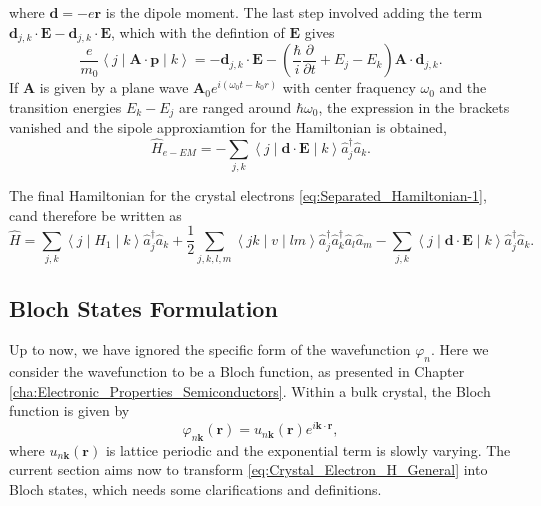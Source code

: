 where $\mathbf{d}=-e\mathbf{r}$ is the dipole moment. The last step
involved adding the term $\mathbf{d}_{j,k}\cdot\mathbf{E}-\mathbf{d}_{j,k}\cdot\mathbf{E}$,
which with the defintion of $\mathbf{E}$ gives\begin{equation}
\frac{e}{m_{0}}\left\langle j\mid\mathbf{A}\cdot\mathbf{p}\mid k\right\rangle =-\mathbf{d}_{j,k}\cdot\mathbf{E}-\left(\frac{\hbar}{i}\frac{\partial}{\partial t}+E_{j}-E_{k}\right)\mathbf{A}\cdot\mathbf{d}_{j,k}.\end{equation}
If $\mathbf{A}$ is given by a plane wave $\mathbf{A}_{0}e^{i\left(\omega_{0}t-k_{0}r\right)}$
with center fraquency $\omega_{0}$ and the transition energies $E_{k}-E_{j}$
are ranged around $\hbar\omega_{0}$, the expression in the brackets
vanished and the sipole approxiamtion for the Hamiltonian is obtained,
\begin{equation}
\hat{H}_{e-EM}=-\sum_{j,k}\left\langle j\mid\mathbf{d}\cdot\mathbf{E}\mid k\right\rangle \hat{a}_{j}^{\dagger}\hat{a}_{k}.\end{equation}


The final Hamiltonian for the crystal electrons \ref{eq:Separated_Hamiltonian-1},
cand therefore be written as \begin{equation}
\hat{H}=\sum_{j,k}\left\langle j\mid H_{1}\mid k\right\rangle \hat{a}_{j}^{\dagger}\hat{a}_{k}+\frac{1}{2}\sum_{j,k,l,m}\left\langle jk\mid v\mid lm\right\rangle \hat{a}_{j}^{\dagger}\hat{a}_{k}^{\dagger}\hat{a}_{l}\hat{a}_{m}-\sum_{j,k}\left\langle j\mid\mathbf{d}\cdot\mathbf{E}\mid k\right\rangle \hat{a}_{j}^{\dagger}\hat{a}_{k}.\label{eq:Crystal_Electron_H_General}\end{equation}



\subsection{Bloch States Formulation}

Up to now, we have ignored the specific form of the wavefunction $\varphi_{n}$.
Here we consider the wavefunction to be a Bloch function, as presented
in Chapter \ref{cha:Electronic_Properties_Semiconductors}. Within
a bulk crystal, the Bloch function is given by \begin{equation}
\varphi_{n\mathbf{k}}(\mathbf{r})=u_{n\mathbf{k}}(\mathbf{r})e^{i\mathbf{k}\cdot\mathbf{r}},\end{equation}
where $u_{n\mathbf{k}}(\mathbf{r})$ is lattice periodic and the exponential
term is slowly varying. The current section aims now to transform
\ref{eq:Crystal_Electron_H_General} into Bloch states, which needs
some clarifications and definitions. 

